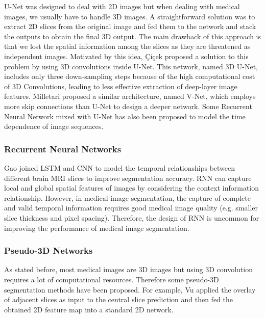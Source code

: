 U-Net was designed to deal with 2D images but when dealing with medical images,
we usually have to handle 3D images. A straightforward solution was to extract
2D slices from the original image and fed them to the network and stack the
outputs to obtain the final 3D output.
The main drawback of this approach is that we lost the spatial information among
the slices as they are threatened as independent images. Motivated by this idea,
Çiçek \etal \cite{cicek20163dunet} proposed a solution to this problem by using
3D convolutions inside U-Net. This network, named 3D U-Net, includes only three
down-sampling steps because of the high computational cost of 3D Convolutions,
leading to less effective extraction of deep-layer image features.
Milletari \etal \cite{milletari2016vnet} proposed a similar architecture, named
V-Net, which employs more skip connections than U-Net to design a deeper
network. Some Recurrent Neural Network mixed with U-Net has also been proposed
to model the time dependence of image sequences.

\subsubsection{Recurrent Neural Networks}
Gao \etal \cite{gao2018lstm} joined LSTM and CNN to model the temporal
relationships between different brain MRI slices to improve segmentation
accuracy. RNN can capture local and global spatial features of images by
considering the context information relationship. However, in medical image
segmentation, the capture of complete and valid temporal information requires
good medical image quality (e.g. smaller slice thickness and pixel spacing).
Therefore, the design of RNN is uncommon for improving the performance of
medical image segmentation.

\subsubsection{Pseudo-3D Networks}
As stated before, most medical images are 3D images but using 3D convolution
requires a lot of computational resources. Therefore some pseudo-3D segmentation
methods have been proposed. For example, Vu \etal \cite{vu2020pseudo3d} applied
the overlay of adjacent slices as input to the central slice prediction and then
fed the obtained 2D feature map into a standard 2D network.

